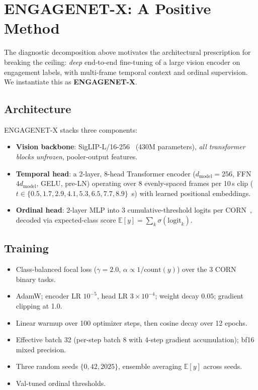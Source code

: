 \section{ENGAGENET-X: A Positive Method}
\label{sec:engagenet}

The diagnostic decomposition above motivates the architectural
prescription for breaking the ceiling: \emph{deep} end-to-end
fine-tuning of a large vision encoder on engagement labels, with
multi-frame temporal context and ordinal supervision. We instantiate
this as \textbf{ENGAGENET-X}.

\subsection{Architecture}

ENGAGENET-X stacks three components:
\begin{itemize}\itemsep0pt
  \item \textbf{Vision backbone}: SigLIP-L/16-256~\cite{zhai2023siglip}
   (430M parameters), \emph{all transformer blocks unfrozen},
   pooler-output features.
  \item \textbf{Temporal head}: a 2-layer, 8-head Transformer encoder
   ($d_{\text{model}} = 256$, FFN $4 d_{\text{model}}$, GELU, pre-LN)
   operating over 8 evenly-spaced frames per 10\,s clip
   ($t \in \{0.5, 1.7, 2.9, 4.1, 5.3, 6.5, 7.7, 8.9\}$~s) with
   learned positional embeddings.
  \item \textbf{Ordinal head}: 2-layer MLP into 3 cumulative-threshold
   logits per CORN~\cite{shi2023corn}, decoded via expected-class score
   $\mathbb{E}[y] = \sum_k \sigma(\text{logit}_k)$.
\end{itemize}

\subsection{Training}

\begin{itemize}\itemsep0pt
  \item Class-balanced focal loss ($\gamma = 2.0$,
   $\alpha \propto 1 / \mathrm{count}(y)$) over the 3 CORN binary tasks.
  \item AdamW; encoder LR $10^{-5}$, head LR $3 \times 10^{-4}$;
   weight decay $0.05$; gradient clipping at 1.0.
  \item Linear warmup over 100 optimizer steps, then cosine decay over
   12 epochs.
  \item Effective batch 32 (per-step batch 8 with 4-step gradient
   accumulation); bf16 mixed precision.
  \item Three random seeds $\{0, 42, 2025\}$, ensemble averaging
   $\mathbb{E}[y]$ across seeds.
  \item Val-tuned ordinal thresholds.
\end{itemize}

